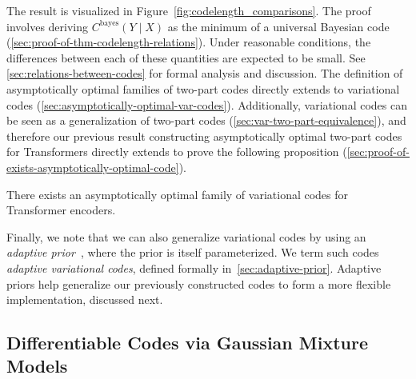 The result is visualized in Figure~\ref{fig:codelength_comparisons}. The proof involves deriving $C^{\text{bayes}}(Y \mid X)$ as the minimum of a universal Bayesian code (\ref{sec:proof-of-thm-codelength-relations}). Under reasonable conditions, the differences between each of these quantities are expected to be small. See \ref{sec:relations-between-codes} for formal analysis and discussion.
The definition of asymptotically optimal families of two-part codes directly extends to variational codes (\ref{sec:asymptotically-optimal-var-codes}). %
Additionally, variational codes can be seen as a generalization of two-part codes (\ref{sec:var-two-part-equivalence}), and therefore our previous result constructing asymptotically optimal two-part codes for Transformers directly extends to prove the following proposition (\ref{sec:proof-of-exists-asymptotically-optimal-code}).

\begin{prop}\label{thm:exists-asymptotically-optimal-code}
There exists an asymptotically optimal family of variational codes for Transformer encoders. 
\end{prop}

Finally, we note that we can also generalize variational codes by using an \emph{adaptive prior}~\citep{hinton1993keeping}, where the prior is itself parameterized. We term such codes \emph{adaptive variational codes}, defined formally in~\ref{sec:adaptive-prior}. Adaptive priors help generalize our previously constructed codes to form a more flexible implementation, discussed next.

\subsection{Differentiable Codes via Gaussian Mixture Models}
\label{sec:transformer-practical-code}

